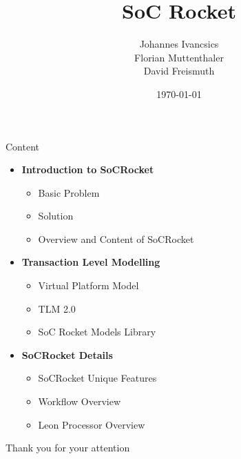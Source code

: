 \documentclass{beamer}
\title[SoC Rocket]{SoC Rocket}
\author{Johannes Ivancsics\\Florian Muttenthaler\\David Freismuth}
\institute[TU Wien]{TU Wien, Vienna, Austria}
\date{\today}
\begin{document}
\begin{frame}
  \titlepage
\end{frame}      


%
%

\begin{frame}{Content}
\begin{itemize}
    \item \textbf{Introduction to SoCRocket}
    \begin{itemize}
        \item Basic Problem
        \item Solution
        \item Overview and Content of SoCRocket
    \end{itemize}
    \item \textbf{Transaction Level Modelling}
    \begin{itemize}
        \item Virtual Platform Model
        \item TLM 2.0
        \item SoC Rocket Models Library
    \end{itemize}
\item \textbf{SoCRocket Details}
    \begin{itemize}
        \item SoCRocket Unique Features
        \item Workflow Overview
        \item Leon Processor Overview
    \end{itemize}
\end{itemize}

\end{frame}





\begin{frame}{}
  \centering\Huge
  Thank you for your attention
\end{frame}

%
%

%
\end{document}

